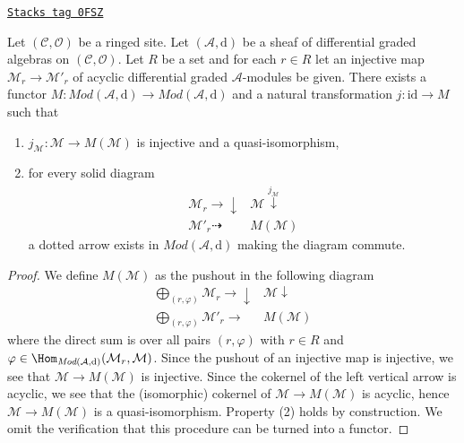 \begin{lemma}
\label{sdga-lemma-functor-set-of-monos}
\href{https://stacks.math.columbia.edu/tag/0FSZ}{\texttt{Stacks tag 0FSZ}}

Let $(\mathcal{C}, \mathcal{O})$ be a ringed site.
Let $(\mathcal{A}, \text{d})$
be a sheaf of differential graded algebras on $(\mathcal{C}, \mathcal{O})$.
Let $R$ be a set and for each $r \in R$ let an injective map
$\mathcal{M}_r \to \mathcal{M}'_r$ of
acyclic differential graded $\mathcal{A}$-modules be given.
There exists a functor $M : \textit{Mod}(\mathcal{A}, \text{d}) \to
\textit{Mod}(\mathcal{A}, \text{d})$ and a natural transformation
$j : \text{id} \to M$ such that
\begin{enumerate}
\item $j_\mathcal{M} : \mathcal{M} \to M(\mathcal{M})$ is injective
and a quasi-isomorphism,
\item for every solid diagram
$$
\begin{array}{cc}\mathcal{M}_r \longrightarrow\downarrow & \mathcal{M} \overset{j_\mathcal{M}}{\downarrow} \\ \mathcal{M}'_r \dashrightarrow & M(\mathcal{M})\end{array}
$$
a dotted arrow exists in $\textit{Mod}(\mathcal{A}, \text{d})$
making the diagram commute.
\end{enumerate}
\end{lemma}

\begin{proof}
We define $M(\mathcal{M})$ as the pushout in the following diagram
$$
\begin{array}{cc}\bigoplus_{(r, \varphi)} \mathcal{M}_r \longrightarrow\downarrow & \mathcal{M} \downarrow \\ \bigoplus_{(r, \varphi)} \mathcal{M}'_r \longrightarrow & M(\mathcal{M})\end{array}
$$
where the direct sum is over all pairs $(r, \varphi)$
with $r \in R$ and $\varphi \in
\Hom_{\textit{Mod}(\mathcal{A}, \text{d})}(\mathcal{M}_r, \mathcal{M})$.
Since the pushout of an injective map is injective, we see that
$\mathcal{M} \to M(\mathcal{M})$ is injective.
Since the cokernel of the left vertical arrow is acyclic,
we see that the (isomorphic) cokernel of $\mathcal{M} \to M(\mathcal{M})$
is acyclic, hence $\mathcal{M} \to M(\mathcal{M})$
is a quasi-isomorphism. Property (2) holds by construction.
We omit the verification that
this procedure can be turned into a functor.
\end{proof}

